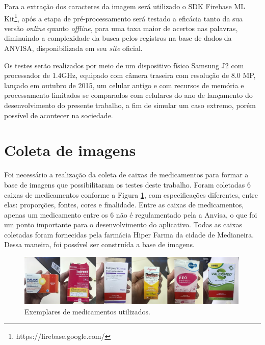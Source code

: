 Para a extração dos caracteres da imagem será utilizado o SDK Firebase ML Kit\footnote{https://firebase.google.com/}, após a etapa de pré-processamento será testado a eficácia tanto da sua versão \textit{online} quanto \textit{offline}, para uma taxa maior de acertos nas palavras, diminuindo a complexidade da busca pelos registros na base de dados da ANVISA, disponibilizada em seu \textit{site} oficial.

Os testes serão realizados por meio de um dispositivo físico Samsung J2 com processador de 1.4GHz, equipado com câmera traseira com resolução de 8.0 MP, lançado em outubro de 2015, um celular antigo e com recursos de memória e processamento limitados se comparados com celulares do ano de lançamento do desenvolvimento do presente trabalho, a fim de simular um caso extremo, porém possível de acontecer na sociedade.





\section{Coleta de imagens}

Foi necessário a realização da coleta de caixas de medicamentos para formar a base de imagens que possibilitaram os testes deste trabalho. Foram coletadas 6 caixas de medicamentos conforme a Figura \ref{exemplares}, com especificações diferentes, entre elas: proporções, fontes, cores e finalidade. Entre as caixas de medicamentos, apenas um medicamento entre os 6 não é regulamentado pela a Anvisa, o que foi um ponto importante para o desenvolvimento do aplicativo. Todas as caixas coletadas foram fornecidas pela farmácia Hiper Farma da cidade de Medianeira. Dessa maneira, foi possível ser construída a base de imagens.

 \begin{figure}[h!]
	\centering
	\includegraphics[width=0.99\textwidth]{Imagens/exemplares.jpg} 
	\caption[Exemplares de medicamentos utilizados.]{Exemplares de medicamentos utilizados.}
	\label{exemplares}
\end{figure}


